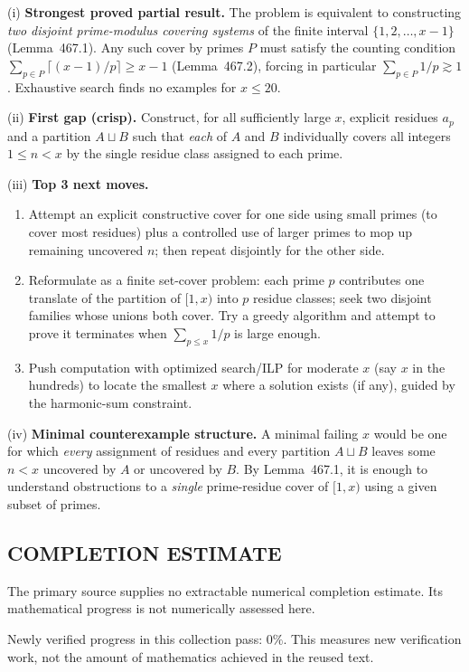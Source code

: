 (i) \textbf{Strongest proved partial result.}
The problem is equivalent to constructing \emph{two disjoint prime-modulus covering systems} of the finite interval $\{1,2,\dots,x-1\}$ (Lemma~467.1). Any such cover by primes $P$ must satisfy the counting condition $\sum_{p\in P} \lceil(x-1)/p\rceil\ge x-1$ (Lemma~467.2), forcing in particular $\sum_{p\in P}1/p\gtrsim 1$. Exhaustive search finds no examples for $x\le 20$.

(ii) \textbf{First gap (crisp).}
Construct, for all sufficiently large $x$, explicit residues $a_p$ and a partition $A\sqcup B$ such that \emph{each} of $A$ and $B$ individually covers all integers $1\le n<x$ by the single residue class assigned to each prime.

(iii) \textbf{Top 3 next moves.}
\begin{enumerate}
\item Attempt an explicit constructive cover for one side using small primes (to cover most residues) plus a controlled use of larger primes to mop up remaining uncovered $n$; then repeat disjointly for the other side.
\item Reformulate as a finite set-cover problem: each prime $p$ contributes one translate of the partition of $[1,x)$ into $p$ residue classes; seek two disjoint families whose unions both cover. Try a greedy algorithm and attempt to prove it terminates when $\sum_{p\le x}1/p$ is large enough.
\item Push computation with optimized search/ILP for moderate $x$ (say $x$ in the hundreds) to locate the smallest $x$ where a solution exists (if any), guided by the harmonic-sum constraint.
\end{enumerate}

(iv) \textbf{Minimal counterexample structure.}
A minimal failing $x$ would be one for which \emph{every} assignment of residues and every partition $A\sqcup B$ leaves some $n<x$ uncovered by $A$ or uncovered by $B$. By Lemma~467.1, it is enough to understand obstructions to a \emph{single} prime-residue cover of $[1,x)$ using a given subset of primes.




\subsection*{COMPLETION ESTIMATE}
The primary source supplies no extractable numerical completion estimate. Its mathematical progress is not numerically assessed here.

Newly verified progress in this collection pass: $0\%$. This measures new verification work, not the amount of mathematics achieved in the reused text.
